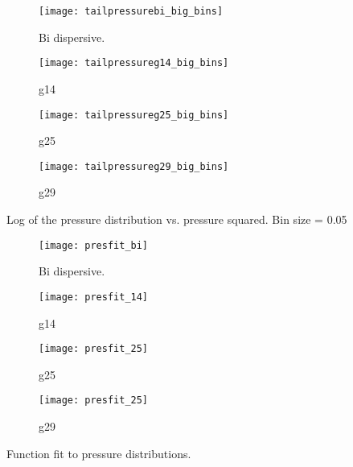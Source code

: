 \documentclass[12pt] {article} %
\begin{document}
\begin{figure}[H]
	\centering
	\begin{subfigure}[h]{0.49\textwidth}
		\centering
		\texttt{[image: tailpressurebi\_big\_bins]}
		\caption{Bi dispersive.}
		\label{fig:tailpressurebi_big_bins_appendix}
	\end{subfigure}
	\hfill
	\begin{subfigure}[h]{0.49\textwidth}
		\centering
		\texttt{[image: tailpressureg14\_big\_bins]}
		\caption{g14}
		\label{fig:tailpressureg14_big_bins_appendix}
	\end{subfigure}
	\begin{subfigure}[h]{0.49\textwidth}
		\centering
		\texttt{[image: tailpressureg25\_big\_bins]}
		\caption{g25}
		\label{fig:tailpressureg25_big_bins_appendix}
	\end{subfigure}
	\begin{subfigure}[h]{0.49\textwidth}
		\centering
		\texttt{[image: tailpressureg29\_big\_bins]}
		\caption{g29}
		\label{fig:tailpressureg29_big_bins_appendix}
	\end{subfigure} 
		\caption{Log of the pressure distribution vs. pressure squared. Bin size = 0.05}
		\label{fig:tailpressure_appendix}
\end{figure}


\begin{figure}[H]
	\centering
	\begin{subfigure}[h]{0.49\textwidth}
	
		\texttt{[image: presfit\_bi]}
		\caption{Bi dispersive.}
		\label{fig:presfit_bi}
	\end{subfigure}
	\hfill
	\begin{subfigure}[h]{0.49\textwidth}
		
		\texttt{[image: presfit\_14]}
		\caption{g14}
		\label{fig:presfit_14_appendix}
	\end{subfigure}
	\begin{subfigure}[h]{0.49\textwidth}
		
		\texttt{[image: presfit\_25]}
		\caption{g25}
		\label{fig:presfit_25_appendix}
	\end{subfigure}
		\begin{subfigure}[h]{0.49\textwidth}
			
			\texttt{[image: presfit\_25]}
			\caption{g29}
			\label{fig:presfit_29_appendix}
		\end{subfigure}
		\caption{Function fit to pressure distributions.}
		\label{fig:presfit_appendix}
\end{figure}
	
\end{document}
